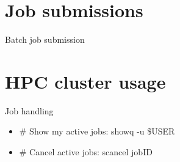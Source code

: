 \documentclass{beamer}
\begin{document}
\section{Job submissions}

\begin{frame}{Batch job submission}


\end{frame}

\section{HPC cluster usage}

\begin{frame}{Job handling}

\begin{itemize}
    \item # Show my active jobs: showq -u \$USER
    \item # Cancel active jobs: scancel jobID
\end{itemize}

\end{frame}
\end{document}
